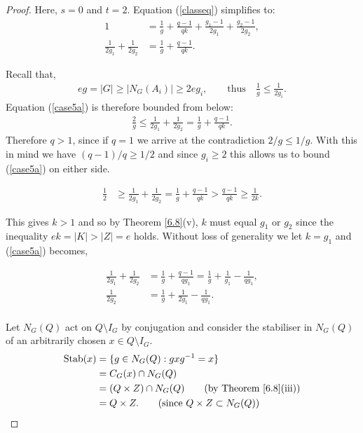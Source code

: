 \documentclass[a4paper , 11pt]{book}
\theoremstyle{definition}
\theoremstyle{remark}
\begin{document}
\begin{proof} Here, $s = 0$ and $t = 2$. Equation (\ref{classeq}) simplifies to:
\begin{align} \label{case5a} 1 &= \frac{1}{g} + \frac{q-1}{qk} + \frac{g_1 -1}{2g_1} + \frac{g_2 -1}{2g_2}, \nonumber
\\ 
\frac{1}{2g_1} + \frac{1}{2g_2} &= \frac{1}{g} + \frac{q-1}{qk}. \end{align}

Recall that,
\begin{align*} eg = |G| \geq  |N_G(A_i)| \geq 2eg_i, \qquad \text{thus} \quad \! \frac{1}{g} \leq \frac{1}{2g_i}.
\end{align*}
Equation (\ref{case5a}) is therefore bounded from below:
\begin{align*}  \frac{2}{g} \leq \frac{1}{2g_1} + \frac{1}{2g_2} = \frac{1}{g} + \frac{q-1}{qk}. 
\end{align*}
Therefore $q>1$, since if $q=1$ we arrive at the contradiction $2/g \leq 1/g$. With this in mind we have $(q-1)/q \geq 1/2$ and since $g_i \geq 2$ this allows us to bound (\ref{case5a}) on either side.

\begin{align*} \frac{1}{2} &\geq \frac{1}{2g_1} + \frac{1}{2g_2} = \frac{1}{g} + \frac{q-1}{qk} > \frac{q-1}{qk} \geq \frac{1}{2k}.
\end{align*}

This gives $k > 1$ and so by Theorem \ref{6.8}(v), $k$ must equal $g_1$ or $g_2$ since the inequality $ek = |K| > |Z| = e$ holds. Without loss of generality we let $k=g_1$ and (\ref{case5a}) becomes,

\begin{align} \label{case5b} \frac{1}{2g_1} + \frac{1}{2g_2} &= \frac{1}{g} + \frac{q-1}{qg_1} = \frac{1}{g} + \frac{1}{g_1} - \frac{1}{qg_1}, \nonumber \\[1.5ex]
 \frac{1}{2g_2} &= \frac{1}{g} + \frac{1}{2g_1} - \frac{1}{qg_1}.
\end{align}
\\
Let $N_G(Q)$ act on $Q \! \setminus \! I_G$ by conjugation and consider the stabiliser in $N_G(Q)$ of an arbitrarily chosen $x \in Q \! \setminus \! I_G$.
\begin{align*} \text{Stab}(x) &= \{ g \in N_G(Q) : g x g^{-1} = x \}
\\ &= C_G(x) \cap N_G(Q)
\\ &= (Q \times Z) \cap N_G(Q) \tag{by Theorem \ref{6.8}(iii)}
\\ &= Q \times Z. \tag{since $Q \times Z \subset N_G(Q)$}
\end{align*}


\end{proof}
\end{document}

